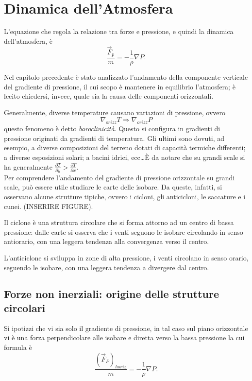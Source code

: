 \chapter{Dinamica dell'Atmosfera}
L'equazione che regola la relazione tra forze e pressione, e quindi la dinamica dell'atmosfera, è
\begin{equation}\label{fpress}
\frac{\vec{F}_p}{m}=-\frac{1}{\rho}\nabla P.
\end{equation}

Nel capitolo precedente è stato analizzato l'andamento della componente verticale del gradiente di pressione, il cui scopo è mantenere in equilibrio l'atmosfera; è lecito chiedersi, invece, quale sia la causa delle componenti orizzontali.

Generalmente, diverse temperature causano variazioni di pressione, ovvero
\begin{equation*}
\nabla_{orizz} T \Rightarrow \nabla_{orizz} P
\end{equation*}
questo fenomeno è detto \emph{baroclinicità}. Questo si configura in gradienti di pressione originati da gradienti di temperatura. Gli ultimi sono dovuti, ad esempio, a diverse composizioni del terreno dotati di capacità termiche differenti; a diverse esposizioni solari; a bacini idrici, ecc\ldots  È da notare che su grandi scale si ha generalmente $\frac{\partial T}{\partial y} > \frac{\partial T}{\partial x}$.\\

Per comprendere l'andamento del gradiente di pressione orizzontale su grandi scale, può essere utile studiare le carte delle isobare. Da queste, infatti, si osservano alcune strutture tipiche, ovvero i cicloni, gli anticicloni, le saccature e i cunei. (INSERIRE FIGURE).

Il ciclone è una struttura circolare che si forma attorno ad un centro di bassa pressione: dalle carte si osserva che i venti seguono le isobare circolando in senso antiorario, con una leggera tendenza alla convergenza verso il centro. 

L'anticiclone si sviluppa in zone di alta pressione, i venti circolano in senso orario, seguendo le isobare, con una leggera tendenza a divergere dal centro.
\section{Forze non inerziali: origine delle strutture circolari}
Si ipotizzi che vi sia solo il gradiente di pressione, in tal caso sul piano orizzontale vi è una forza perpendicolare alle isobare e diretta verso la bassa pressione la cui formula è
\begin{equation}
\frac{(\vec{F}_P)_{horiz}}{m}=-\frac{1}{\rho}\nabla P.
\end{equation}

